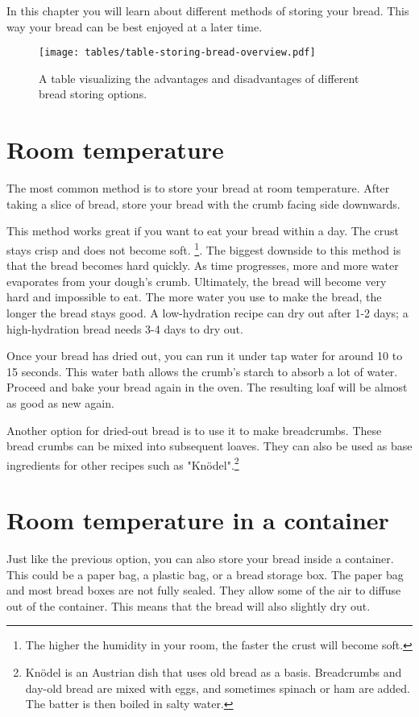In this chapter you will learn about different
methods of storing your bread. This way
your bread can be best enjoyed at a later
time.

\begin{figure}[!htb]
  \texttt{[image: tables/table-storing-bread-overview.pdf]}
  \caption{A table visualizing the advantages and disadvantages
  of different bread storing options.}
  \label{table:bread-storage}
\end{figure}

\section{Room temperature}

The most common method is to store your bread
at room temperature. After taking a slice of bread,
store your bread with the crumb facing side
downwards.

This method works great if you want to eat
your bread within a day. The crust stays
crisp and does not become soft. \footnote{
  The higher the humidity in your room, the faster
  the crust will become soft.
}. The biggest downside to this method is that
the bread becomes hard quickly. As time progresses,
more and more water evaporates from your dough's
crumb. Ultimately, the bread will become very hard
and impossible to eat. The more water you use
to make the bread, the longer the bread stays good.
A low-hydration recipe can dry out after 1-2 days;
a high-hydration bread needs 3-4 days to dry out.

Once your bread has dried out, you can run it under
tap water for around 10 to 15 seconds. 
This water bath allows the
crumb's starch to absorb a lot of water. Proceed and
bake your bread again in the oven. The resulting loaf
will be almost as good as new again.

Another option for dried-out bread is to use it
to make breadcrumbs. These bread crumbs can be mixed
into subsequent loaves. They can also be used as
base ingredients for other recipes such as "Knödel".\footnote{
  Knödel is an Austrian dish that uses old bread as a basis.
  Breadcrumbs and day-old bread are mixed with eggs, and sometimes
  spinach or ham are added. The batter is then boiled in salty water.
}

\section{Room temperature in a container}

Just like the previous option, you can also store your
bread inside a container. This could be a paper bag, 
a plastic bag, or a bread storage box. The paper bag and
most bread boxes are not fully sealed. They allow some of
the air to diffuse out of the container. This means that
the bread will also slightly dry out.

